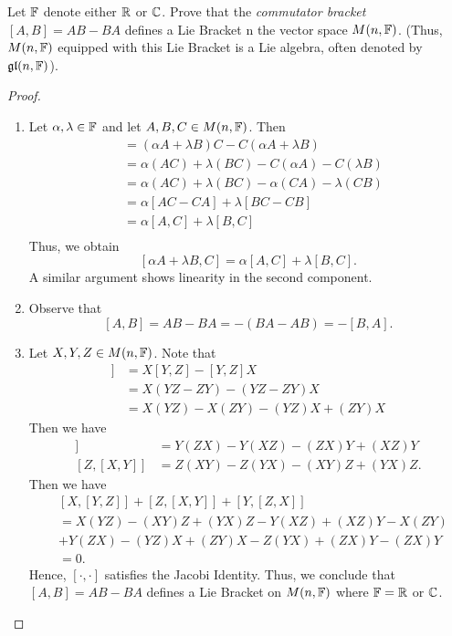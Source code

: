 \documentclass[a4paper]{article}
\begin{document}
\begin{problem}
    Let \( \mathbb{F}  \) denote either \( \mathbb{R}  \) or \( \mathbb{C}  \). Prove that the \textit{commutator bracket} \( [A,B] = AB - BA \) defines a Lie Bracket n the vector space \( M(n,\mathbb{F}) \). (Thus, \( M(n,\mathbb{F})  \) equipped with this Lie Bracket is a Lie algebra, often denoted by \( \mathfrak{g} \mathfrak{l}(n, \mathbb{F}) \)).
\end{problem}
\begin{proof}
\begin{enumerate}
    \item[(i)] Let \( \alpha , \lambda \in \mathbb{F}  \) and let \( A, B , C  \in M(n,\mathbb{F}) \). Then
        \begin{align*}
            [\alpha A + \lambda B , C ]  &= (\alpha A + \lambda B ) C - C (\alpha A + \lambda B ) \\
                                         &= \alpha (AC) + \lambda (BC) - C (\alpha A ) - C (\lambda B ) \\
                                         &= \alpha (AC) + \lambda (BC) - \alpha (CA) - \lambda (CB) \\
                                         &= \alpha [AC - CA ] + \lambda [BC - CB] \\
                                         &= \alpha[A,C] + \lambda [B,C] \\
        \end{align*}
        Thus, we obtain
        \[  [\alpha A + \lambda B, C ] = \alpha [A,C] + \lambda [B,C]. \]
        A similar argument shows linearity in the second component. 
    \item[(ii)] Observe that 
        \[ [A,B] = AB - BA = - (BA - AB) = - [B,A]. \]
    \item[(iii)] Let \( X,Y,Z  \in M(n,\mathbb{F}) \). Note that 
        \begin{align*}
            [X, [Y,Z]] &= X[Y,Z] - [Y,Z] X  \\
                       &= X(YZ - ZY) - (YZ -ZY) X  \\
                       &= X(YZ) - X(ZY) - (YZ)X + (ZY)X 
        \end{align*}
        Then we have 
        \begin{align*}
            [Y,[Z,X]] &= Y(ZX) - Y(XZ) - (ZX)Y + (XZ)Y \\
            [Z,[X,Y]] &= Z(XY) - Z(YX) - (XY)Z + (YX)Z.
        \end{align*}
        Then we have 
        \begin{align*}
            &[X,[Y,Z]] + [Z,[X,Y]] + [Y, [Z,X]]  \\
            &= X(YZ) - (XY)Z + (YX)Z - Y(XZ) + (XZ)Y - X(ZY) \\
            &+Y(ZX) - (YZ)X + (ZY)X - Z(YX) + (ZX)Y - (ZX)Y \\
            &= 0.
        \end{align*}
        Hence, \( [\cdot, \cdot ] \) satisfies the Jacobi Identity. Thus, we conclude that \( [A,B] = AB - BA \) defines a Lie Bracket on \( M(n,\mathbb{F}) \) where \( \mathbb{F} = \mathbb{R}  \) or \( \mathbb{C}  \).
\end{enumerate}
\end{proof}
\end{document}
